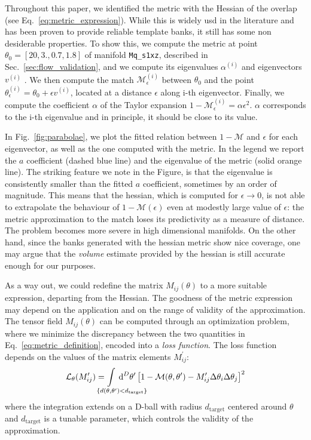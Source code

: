 \documentclass[twocolumn,showpacs,preprintnumbers,nofootinbib,prd,
superscriptaddress,10pt]{revtex4-2}
\newcommand{\dvol}[2]{\ensuremath{\operatorname{d}^{#2}\!{#1}}}
\begin{document}
Throughout this paper, we identified the metric with the Hessian of the overlap (see Eq.~\eqref{eq:metric_expression}). While this is widely usd in the literature and has been proven to provide reliable template banks, it still has some non desiderable properties.
To show this, we compute the metric at point $\theta_0 = [20, 3., 0.7, 1.8]$ of manifold \texttt{Mq\_s1xz}, described in Sec.~\ref{sec:flow_validation}, and we compute its eigenvalues $\alpha^{(i)}$ and eigenvectors $v^{(i)}$ . We then compute the match $\mathcal{M}^{(i)}_\epsilon$ between $\theta_0$ and the point $\theta^{(i)}_\epsilon = \theta_0 + \epsilon v^{(i)}$, located at a distance $\epsilon$ along i-th eigenvector.
Finally, we  compute the coefficient $\alpha$ of the Taylor expansion $1 - \mathcal{M}^{(i)}_\epsilon = \alpha  \epsilon^2$.
$\alpha$ corresponds to the i-th eigenvalue and in principle, it should be close to its value.

In Fig.~\ref{fig:parabolae}, we plot the fitted relation between $1 - \mathcal{M}$ and $\epsilon$ for each eigenvector, as well as the one computed with the metric. In the legend we report the $a$ coefficient (dashed blue line) and the eigenvalue of the metric (solid orange line).
The striking feature we note in the Figure, is that the eigenvalue is consistently smaller than the fitted $a$ coefficient, sometimes by an order of magnitude.
This means that the hessian, which is computed for $\epsilon\rightarrow 0$, is not able to extrapolate the behaviour of $1 - \mathcal{M}(\epsilon)$ even at modestly large value of $\epsilon$: the metric approximation to the match loses its predictivity as a measure of distance.
The problem becomes more severe in high dimensional manifolds.
On the other hand, since the banks generated with the hessian metric show nice coverage, one may argue that the {\it volume} estimate provided by the hessian is still accurate enough for our purposes.

As a way out, we could redefine the matrix $M_{ij}(\theta)$ to a more suitable expression, departing from the Hessian.
The goodness of the metric expression may depend on the application and on the range of validity of the approximation.
The tensor field $M_{ij}(\theta)$ can be computed through an optimization problem, where we minimize the discrepancy between the two quantities in Eq.~\eqref{eq:metric_definition}, encoded into a {\it loss function}.
The loss function depends on the values of the matrix elements $M^\prime_{ij}$:
\begin{equation} \label{eq:loss_function}
	\mathcal{L}_\theta(M^\prime_{ij}) = \hspace{-4em} \int\limits_{\hspace{3em}\{d(\theta,\theta^\prime) < d_\mathrm{target}\}} \hspace{-3.8em}
		\dvol{\theta^\prime}{D}  \left[ 1 - \mathcal{M}(\theta,\theta^\prime) - M^\prime_{ij} \Delta\theta_i \Delta\theta_j \right]^2
\end{equation}
where the integration extends on a D-ball with radius $d_\mathrm{target}$ centered around $\theta$ and $d_\mathrm{target}$ is a tunable parameter, which controls the validity of the approximation.
\end{document}
